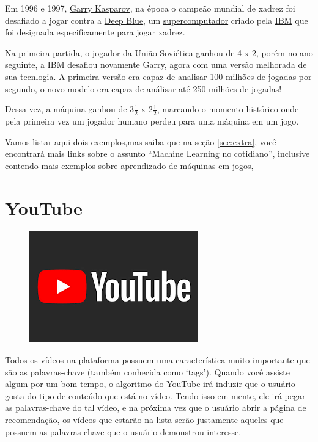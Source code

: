 \documentclass[12pt]{article}
\begin{document}
    Em 1996 e 1997, \href{https://pt.wikipedia.org/wiki/Garry_Kasparov}{Garry Kasparov}, 
    na época o campeão mundial de xadrez foi desafiado
    a jogar contra a \href{https://pt.wikipedia.org/wiki/Deep_Blue}{Deep Blue}, um \href{https://canaltech.com.br/produtos/o-que-e-supercomputador/}{supercomputador} 
    criado pela \href{https://pt.wikipedia.org/wiki/IBM}{IBM} que foi designada especificamente para jogar xadrez. 

    Na primeira partida, o jogador da \href{https://pt.wikipedia.org/wiki/Uni%C3%A3o_Sovi%C3%A9tica}{União Soviética} 
    ganhou de 4 x 2, porém no ano seguinte, a IBM desafiou novamente Garry, agora com uma versão melhorada de sua tecnlogia. A 
    primeira versão era capaz de analisar 100 milhões de jogadas por segundo, o novo modelo era capaz
    de análisar até 250 milhões de jogadas!

    Dessa vez, a máquina ganhou de \(3\frac{1}{2}\) x \(2\frac{1}{2}\), marcando o momento histórico 
    onde pela primeira vez um jogador humano perdeu para uma máquina em um jogo.

    Vamos listar aqui dois exemplos,mas saiba que na seção \ref{sec:extra}, você encontrará mais links sobre o assunto “Machine Learning no cotidiano”, inclusive
    contendo mais exemplos sobre aprendizado de máquinas em jogos, 

    \newpage
    \section{YouTube} \label{sec:youtube}

    \begin{figure}[htp]
        \centering
        \includegraphics{youtube.png}
    \end{figure}

    Todos os vídeos na plataforma possuem uma característica muito importante
    que são as palavras-chave (também conhecida como ‘tags’). Quando você 
    assiste algum por um bom tempo, o algoritmo do YouTube irá induzir que 
    o usuário gosta do tipo de conteúdo que está no vídeo. Tendo isso em mente,
    ele irá pegar as palavras-chave do tal vídeo, e na próxima vez que o usuário 
    abrir a página de recomendação, os vídeos que estarão na lista serão 
    justamente aqueles que possuem as palavras-chave que o usuário demonstrou interesse.
\end{document}
